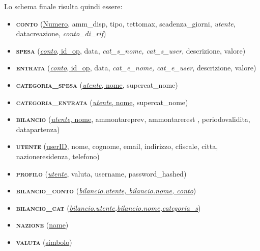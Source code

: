 \documentclass[a4paper,10pt]{article}
\newcommand{\relaz}[1]{\textsc{\textbf{#1}}}
\newcommand{\attr}[1]{\textsf{#1}}
\newcommand{\key}[1]{\uline{#1}}
\newcommand{\fkey}[1]{\textit{#1}}
\begin{document}
Lo schema finale risulta quindi essere:
\begin{itemize}
\item[]\relaz{conto} (\attr{\key{Numero}}, \attr{amm\_{}disp}, \attr{tipo}, \attr{tettomax}, \attr{scadenza\_{}giorni}, \attr{\fkey{utente}}, \attr{datacreazione}, \attr{\fkey{conto\_{}di\_{}rif}})

\item[]\relaz{spesa} (\attr{\key{\fkey{conto}, id\_{}op}},  \attr{data, \fkey{cat\_{}s\_{}nome, cat\_{}s\_{}user}, descrizione, valore})

\item[]\relaz{entrata} (\attr{\key{\fkey{conto}, id\_{}op}},  \attr{data, \fkey{cat\_{}e\_{}nome, cat\_{}e\_{}user}, descrizione, valore})

\item[]\relaz{categoria\_{}spesa} (\attr{\key{\fkey{utente}, nome}, supercat\_{}nome})
\item[]\relaz{categoria\_{}entrata} (\attr{\key{\fkey{utente}, nome}, supercat\_{}nome})

\item[]\relaz{bilancio} (\attr{\key{\fkey{utente}, nome}, ammontareprev, ammontarerest , periodovalidita, datapartenza})

\item[]\relaz{utente} (\attr{\key{userID}, nome, cognome, email, indirizzo, cfiscale, citta, nazioneresidenza, telefono})

\item[]\relaz{profilo} (\attr{\key{\fkey{utente}}, valuta, username, password\_{}hashed})

\item[]\relaz{bilancio\_{}conto} (\attr{\key{\fkey{bilancio.utente, bilancio.nome, conto}}})

\item[]\relaz{bilancio\_{}cat} (\attr{\key{\fkey{bilancio.utente,bilancio.nome,categoria\_{}s}}})

\item[]\relaz{nazione} (\attr{\key{name}})

\item[]\relaz{valuta} (\attr{\key{simbolo}})
\end{itemize}
\end{document}
